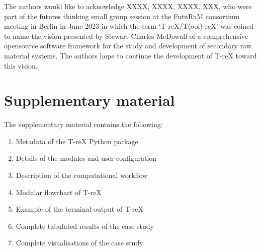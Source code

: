 \documentclass[review,3p,authoryear]{elsarticle}
\begin{document}
The authors would like to acknowledge XXXX, XXXX, XXXX, XXX, who were part of the futures thinking small group session at the FutuRaM consortium meeting in Berlin in June 2023 in which the term `T-reX/T(ool)-reX' was coined to name the vision presented by Stewart Charles McDowall of a comprehensive opensource software framework for the study and development of secondary raw material systems. The authors hope to continue the development of T-reX toward this vision.

\section*{Supplementary material}\label{sec:supplementary}
The supplementary material contains the following:
\begin{enumerate}
    \item Metadata of the T-reX Python package
    \item Details of the modules and user configuration
    \item Description of the computational workflow
    \item Modular flowchart of T-reX
    \item Example of the terminal output of T-reX
    \item Complete tabulated results of the case study
    \item Complete visualisations of the case study
\end{enumerate}






\end{document}
